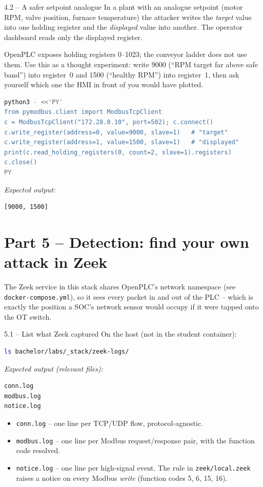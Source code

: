 \documentclass[11pt,a4paper]{article}
\begin{document}
\begin{stepbox}{4.2 -- A safer setpoint analogue}
In a plant with an analogue setpoint (motor RPM, valve position,
furnace temperature) the attacker writes the \emph{target} value
into one holding register and the \emph{displayed} value into
another. The operator dashboard reads only the displayed register.

OpenPLC exposes holding registers 0--1023; the conveyor ladder
does not use them. Use this as a thought experiment: write 9000
(``RPM target far above safe band'') into register~0 and 1500
(``healthy RPM'') into register~1, then ask yourself which one the
HMI in front of you would have plotted.
\begin{lstlisting}[language=bash]
python3 - <<'PY'
from pymodbus.client import ModbusTcpClient
c = ModbusTcpClient("172.28.0.10", port=502); c.connect()
c.write_register(address=0, value=9000, slave=1)   # "target"
c.write_register(address=1, value=1500, slave=1)   # "displayed"
print(c.read_holding_registers(0, count=2, slave=1).registers)
c.close()
PY
\end{lstlisting}
\textit{Expected output:}
\begin{lstlisting}
[9000, 1500]
\end{lstlisting}
\end{stepbox}

\section*{Part 5 -- Detection: find your own attack in Zeek}

The Zeek service in this stack shares OpenPLC's network namespace
(see \texttt{docker-compose.yml}), so it sees every packet
in and out of the PLC -- which is exactly the position a SOC's
network sensor would occupy if it were tapped onto the OT switch.

\begin{stepbox}{5.1 -- List what Zeek captured}
On the host (not in the student container):
\begin{lstlisting}[language=bash]
ls bachelor/labs/_stack/zeek-logs/
\end{lstlisting}
\textit{Expected output (relevant files):}
\begin{lstlisting}
conn.log
modbus.log
notice.log
\end{lstlisting}
\begin{itemize}\setlength{\itemsep}{1pt}
  \item \texttt{conn.log} -- one line per TCP/UDP flow, protocol-agnostic.
  \item \texttt{modbus.log} -- one line per Modbus request/response pair,
        with the function code resolved.
  \item \texttt{notice.log} -- one line per high-signal event. The
        rule in \texttt{zeek/local.zeek} raises a notice on every
        Modbus \emph{write} (function codes 5, 6, 15, 16).
\end{itemize}
\end{stepbox}
\end{document}
